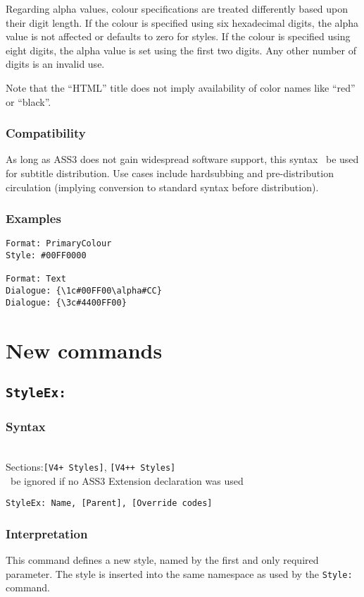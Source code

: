 \documentclass{spec}
\newcommand{\syntax}[1]{
	\subsubsection*{Syntax}
	\begin{tabbing}
	\hspace{2cm}\=\\[-16pt]
	#1
	\end{tabbing}
}
\newcommand{\mustuse}{\must\ be ignored if no ASS3 Extension declaration was used}
\newcommand{\secspecs}[2]{Sections:\>\texttt{#1}, \texttt{#2}}
\begin{document}
Regarding alpha values, colour specifications are treated differently
based upon their digit length. If the colour is specified using six
hexadecimal digits, the alpha value is not affected or defaults to zero
for styles. If the colour is specified using eight digits, the alpha
value is set using the first two digits. Any other number of digits
is an invalid use.

Note that the ``HTML'' title does not imply availability of color names
like ``red'' or ``black''.

\subsubsection*{Compatibility}
As long as ASS3 does not gain widespread software support, this syntax
\shouldnot\ be used for subtitle distribution. Use cases include
hardsubbing and pre-distribution circulation (implying conversion to
standard syntax before distribution).

\subsubsection*{Examples}
\begin{verbatim}
Format: PrimaryColour
Style: #00FF0000

Format: Text
Dialogue: {\1c#00FF00\alpha#CC}
Dialogue: {\3c#4400FF00}
\end{verbatim}

\section{New commands}
\subsection{\texttt{StyleEx:}}
\syntax{
	\secspecs{[V4+ Styles]}{[V4++ Styles]}\\
	\mustuse
}

\begin{verbatim}
StyleEx: Name, [Parent], [Override codes]
\end{verbatim}

\subsubsection*{Interpretation}
This command defines a new style, named by the first and only required
parameter. The style is inserted into the same namespace as used by the
\verb!Style:! command.
\end{document}

